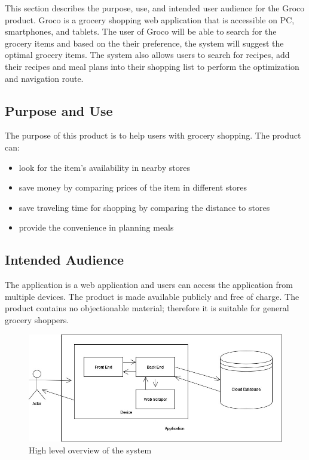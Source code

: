This section describes the purpose, use, and intended user audience for the Groco product. Groco is a grocery shopping web application that is accessible on PC, smartphones, and tablets. The user of Groco will be able to search for the grocery items and based on the their preference, the system will suggest the optimal grocery items. The system also allows users to search for recipes, add their recipes and meal plans into their shopping list to perform the optimization and navigation route.

\subsection{Purpose and Use}
The purpose of this product is to help users with grocery shopping. The product can:
\begin{itemize}
    \item look for the item's availability in nearby stores
    \item save money by comparing prices of the item in different stores
    \item save traveling time for shopping by comparing the distance to stores
    \item provide the convenience in planning meals
\end{itemize} 

\subsection{Intended Audience}
The application is a web application and users can access the application from multiple devices. The product is made available publicly and free of charge. The product contains no objectionable material; therefore it is suitable for general grocery shoppers.

\begin{figure}[h!]
	\centering
   	\includegraphics[width=1\textwidth]{images/system_diagram.jpg}
    \caption{High level overview of the system}
\end{figure}
